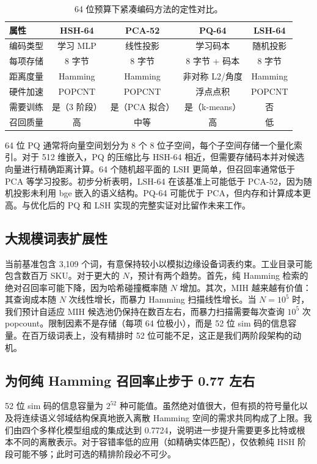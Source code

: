 \documentclass[11pt,a4paper]{article}
\begin{document}
\begin{table}[htbp]
\centering
\caption{64 位预算下紧凑编码方法的定性对比。}
\label{tab:pq-lsh-cn}
\begin{tabular}{lcccc}
\toprule
\textbf{属性} & \textbf{HSH-64} & \textbf{PCA-52} & \textbf{PQ-64} & \textbf{LSH-64} \\
\midrule
编码类型 & 学习 MLP & 线性投影 & 学习码本 & 随机投影 \\
每项存储 & 8 字节 & 8 字节 & 8 字节 + 码本 & 8 字节 \\
距离度量 & Hamming & Hamming & 非对称 L2/角度 & Hamming \\
硬件加速 & POPCNT & POPCNT & 浮点点积 & POPCNT \\
需要训练 & 是（3 阶段） & 是（PCA 拟合） & 是（k-means） & 否 \\
召回质量 & 高 & 中等 & 高 & 低 \\
\bottomrule
\end{tabular}
\end{table}

64 位 PQ 通常将向量空间划分为 8 个 8 位子空间，每个子空间存储一个量化索引。对于 512 维嵌入，PQ 的压缩比与 HSH-64 相近，但需要存储码本并对候选向量进行精确距离计算。64 个随机超平面的 LSH 更简单，但召回率通常低于 PCA 等学习投影。初步分析表明，LSH-64 在该基准上可能低于 PCA-52，因为随机投影未利用 bge 嵌入的语义结构。PQ-64 可能优于 PCA，但内存和计算成本更高。与优化后的 PQ 和 LSH 实现的完整实证对比留作未来工作。

\subsection{大规模词表扩展性}

当前基准包含 3,109 个词，有意保持较小以模拟边缘设备词表约束。工业目录可能包含数百万 SKU。对于更大的 $N$，预计有两个趋势。首先，纯 Hamming 检索的绝对召回率可能下降，因为哈希碰撞概率随 $N$ 增加。其次，MIH 越来越有价值：其查询成本随 $N$ 次线性增长，而暴力 Hamming 扫描线性增长。当 $N=10^5$ 时，我们预计自适应 MIH 候选池仍保持在数百左右，而暴力扫描需要每次查询 $10^5$ 次 popcount。限制因素不是存储（每项 64 位极小），而是 52 位 sim 码的信息容量。在百万级词表上，没有精排时 52 位可能不足，这正是我们两阶段架构的动机。

\subsection{为何纯 Hamming 召回率止步于 0.77 左右}

52 位 sim 码的信息容量为 $2^{52}$ 种可能值。虽然绝对值很大，但有损的符号量化以及将连续语义邻域结构保真地嵌入离散 Hamming 空间的需求共同构成了上限。我们由四个多样化模型组成的集成达到 0.7724，说明进一步提升需要更多比特或根本不同的离散表示。对于容错率低的应用（如精确实体匹配），仅依赖纯 HSH 阶段可能不够；此时可选的精排阶段必不可少。
\end{document}
